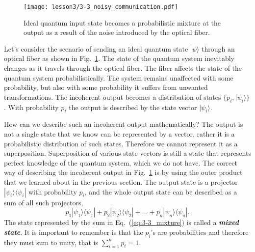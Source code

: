 \begin{figure}[t]
    \centering
    \texttt{[image: lesson3/3-3\_noisy\_communication.pdf]}
    \caption[Noisy quantum communication]{Ideal quantum input state becomes a probabilistic mixture at the output as a result of the noise introduced by the optical fiber.}
    \label{fig:3-3_noisy_communication}
\end{figure}

Let's consider the scenario of sending an ideal quantum state $|\psi\rangle$ through an optical fiber as shown in Fig.~\ref{fig:3-3_noisy_communication}.
The state of the quantum system inevitably changes as it travels through the optical fiber.
The fiber affects the state of the quantum system probabilistically.
The system remains unaffected with some probability, but also with some probability it suffers from unwanted transformations.
The incoherent output becomes a distribution of states $\{p_i, |\psi_i\rangle\}$.
With probability $p_i$ the output is described by the state vector $|\psi_i\rangle$.

How can we describe such an incoherent output mathematically?
The output is not a single state that we know can be represented by a vector, rather it is a probabilistic distribution of such states.
Therefore we cannot represent it as a superposition.
Superposition of various state vectors is still a state that represents perfect knowledge of the quantum system, which we do not have.
The correct way of describing the incoherent output in Fig.~\ref{fig:3-3_noisy_communication} is by using the outer product that we learned about in the previous section.
The output state is a projector $|\psi_i\rangle\langle\psi_i|$ with probability $p_i$, and the whole output state can be described as a sum of all such projectors,
\begin{equation}
    p_1 |\psi_1\rangle\langle\psi_1| + p_2 |\psi_2\rangle\langle\psi_2| + \ldots + p_n |\psi_n\rangle\langle\psi_n|.
    \label{eq:3-3_mixture}
\end{equation}
The state represented by the sum in Eq.~(\ref{eq:3-3_mixture}) is called a \textbf{\emph{mixed state}}.
It is important to remember is that the $p_i$'s are probabilities and therefore they must sum to unity, that is $\sum_{i=1}^n p_i=1$.


